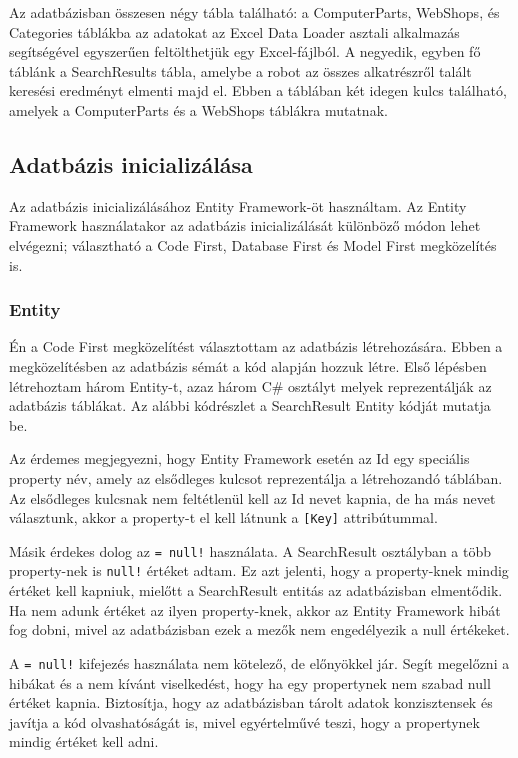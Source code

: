 \documentclass[
]{thesis-ekf}
\theoremstyle{definition}
\theoremstyle{remark}
\begin{document}
Az adatbázisban összesen négy tábla található: a ComputerParts, WebShops, és Categories táblákba az adatokat az Excel Data Loader asztali alkalmazás segítségével egyszerűen feltölthetjük egy Excel-fájlból.
A negyedik, egyben fő táblánk a SearchResults tábla, amelybe a robot az összes alkatrészről talált keresési eredményt elmenti majd el. Ebben a táblában két idegen kulcs található, amelyek a ComputerParts és a WebShops táblákra mutatnak.
\subsection{Adatbázis inicializálása}
Az adatbázis inicializálásához Entity Framework-öt használtam. Az Entity Framework használatakor az adatbázis inicializálását különböző módon lehet elvégezni; választható a Code First, Database First és Model First megközelítés is.
\subsubsection{Entity}
Én a Code First megközelítést választottam az adatbázis létrehozására. Ebben a megközelítésben az adatbázis sémát a kód alapján hozzuk létre. Első lépésben létrehoztam három Entity-t, azaz három C\# osztályt melyek reprezentálják az adatbázis táblákat. Az alábbi kódrészlet a SearchResult Entity kódját mutatja be.

	
Az érdemes megjegyezni, hogy Entity Framework esetén az Id egy speciális property név, amely az elsődleges kulcsot reprezentálja a létrehozandó táblában. Az elsődleges kulcsnak nem feltétlenül kell az Id nevet kapnia, de ha más nevet választunk, akkor a property-t el kell látnunk a \texttt{[Key]} attribútummal.

Másik érdekes dolog az \texttt{= null!} használata. A SearchResult osztályban a több property-nek is \texttt{null!} értéket adtam. Ez azt jelenti, hogy a property-knek mindig értéket kell kapniuk, mielőtt a SearchResult entitás az adatbázisban elmentődik. Ha nem adunk értéket az ilyen property-knek, akkor az Entity Framework hibát fog dobni, mivel az adatbázisban ezek a mezők nem engedélyezik a null értékeket.

A \texttt{= null!} kifejezés használata nem kötelező, de előnyökkel jár. Segít megelőzni a hibákat és a nem kívánt viselkedést, hogy ha egy propertynek nem szabad null értéket kapnia. Biztosítja, hogy az adatbázisban tárolt adatok konzisztensek és javítja a kód olvashatóságát is, mivel egyértelművé teszi, hogy a propertynek mindig értéket kell adni.
\end{document}

